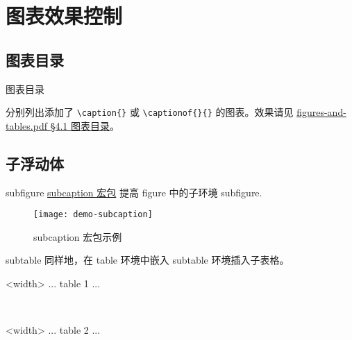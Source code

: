 \documentclass[final]{ctexbeamer}
\begin{document}
\section{图表效果控制}
\subsection{图表目录}
% 
\begin{frame}[fragile]{图表目录}
\begin{texlst}[numbers=none]
\listoffigures
\listoftables
\end{texlst}
分别列出添加了 \verb+\caption{}+ 或 \verb+\captionof{}{}+ 的图表。效果请见 \href{run:figures-and-tables.pdf#page.16}{figures-and-tables.pdf \S 4.1 图表目录}。
\end{frame}


\subsection{子浮动体}\label{sec:subfloats}
% 
\begin{frame}[fragile]{subfigure}
\href{http://www.ctan.org/pkg/subcaption}{subcaption 宏包} \cite{subcaption} 提高 figure 中的子环境 subfigure.
\end{frame}


\begin{frame}
\begin{figure}[]
  \centering
  \texttt{[image: demo-subcaption]}
  \caption{subcaption 宏包示例}
  \label{demo-subcaption}
\end{figure}
\end{frame}


\begin{frame}[fragile]{subtable}
同样地，在 table 环境中嵌入 subtable 环境插入子表格。
\begin{texlst}
\begin{table}[<placement specifier>]
  \begin{subtable}{<width>}
      \centering
      ... table 1 ...
  \caption{<sub caption>}
  \end{subtable}
  ~
  \begin{subtable}{<width>}
      \centering
      ... table 2 ...
      \caption{<sub caption>}
  \end{subtable}
\end{table}
\end{texlst}
\end{frame}
\end{document}
